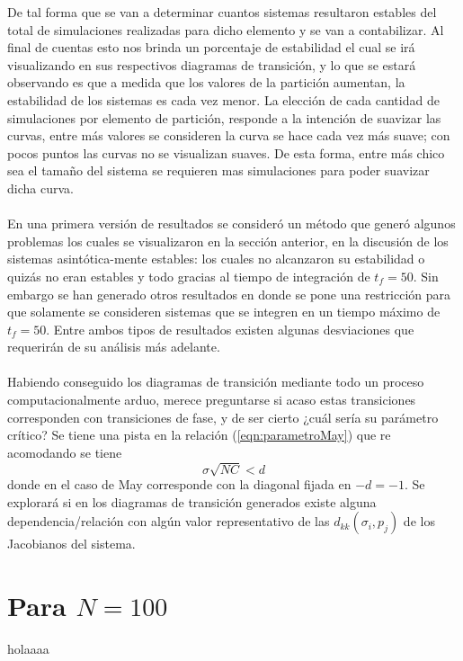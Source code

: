 De tal forma que se van a determinar cuantos sistemas resultaron estables del total de simulaciones realizadas para dicho elemento y se van a contabilizar. Al final de cuentas esto nos brinda un porcentaje de estabilidad el cual se irá visualizando en sus respectivos diagramas de transición, y lo que se estará observando es que a medida que los valores de la partición aumentan, la estabilidad de los sistemas es cada vez menor. La elección de cada cantidad de simulaciones por elemento de partición, responde a la intención de suavizar las curvas, entre más valores se consideren la curva se hace cada vez más suave; con pocos puntos las curvas no se visualizan suaves. De esta forma, entre más chico sea el tamaño del sistema se requieren mas simulaciones para poder suavizar dicha curva.\\
\\
En una primera versión de resultados se consideró un método que generó algunos problemas los cuales se visualizaron en la sección anterior, en la discusión de los sistemas asintótica-mente estables: los cuales no alcanzaron su estabilidad o quizás no eran estables y todo gracias al tiempo de integración de $t_f=50$. Sin embargo se han generado otros resultados en donde se pone una restricción para que solamente se consideren sistemas que se integren en un tiempo máximo de $t_f=50$. Entre ambos tipos de resultados existen algunas desviaciones que requerirán de su análisis más adelante.\\
\\
Habiendo conseguido los diagramas de transición mediante todo un proceso computacionalmente arduo, merece preguntarse si acaso estas transiciones corresponden con transiciones de fase, y de ser cierto ¿cuál sería su parámetro crítico? Se tiene una pista en la relación (\ref{eqn:parametroMay}) que re acomodando se tiene
\begin{equation}\label{eqn:ParametroCritico}
	\sigma\sqrt{NC}<d
\end{equation}
donde en el caso de May corresponde con la diagonal fijada en $-d=-1$. Se explorará si en los diagramas de transición generados existe alguna dependencia/relación con algún valor representativo de las $d_{kk}(\sigma_i,p_j)$ de los Jacobianos del sistema.

\section{Para $N=100$}

holaaaa